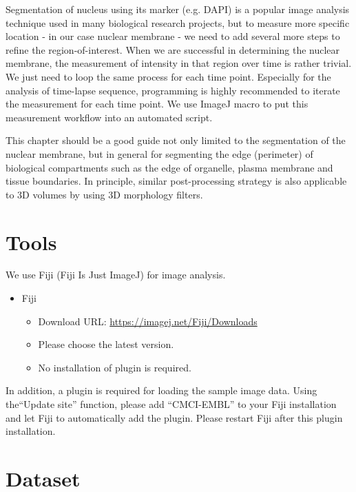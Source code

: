 Segmentation of nucleus using its marker (e.g. DAPI) is a popular image analysis technique used in many biological research projects, but to measure more specific location - in our case nuclear membrane - we need to add several more steps to refine the region-of-interest. When we are successful in determining the nuclear membrane, the measurement of intensity in that region over time is rather trivial. We just need to loop the same process for each time point. Especially for the analysis of time-lapse sequence, programming is highly recommended to iterate the measurement for each time point. We use ImageJ macro to put this measurement workflow into an automated script. 

This chapter should be a good guide not only limited to the segmentation of the nuclear membrane, but in general for segmenting the edge (perimeter) of biological compartments such as the edge of organelle, plasma membrane and tissue boundaries. In principle, similar post-processing strategy is also applicable to 3D volumes by using 3D morphology filters. 

\section{Tools}


We use Fiji (Fiji Is Just ImageJ) for image analysis.

\begin{itemize}
    \item Fiji
    \begin{itemize}
        \item Download URL: \url{https://imagej.net/Fiji/Downloads}
        \item Please choose the latest version. 
        \item No installation of plugin is required. 
    \end{itemize}
\end{itemize}

In addition, a plugin is required for loading the sample image data. Using the``Update site'' function, please add ``CMCI-EMBL'' to your Fiji installation and let Fiji to automatically add the plugin. Please restart Fiji after this plugin installation. 

\section{Dataset}

